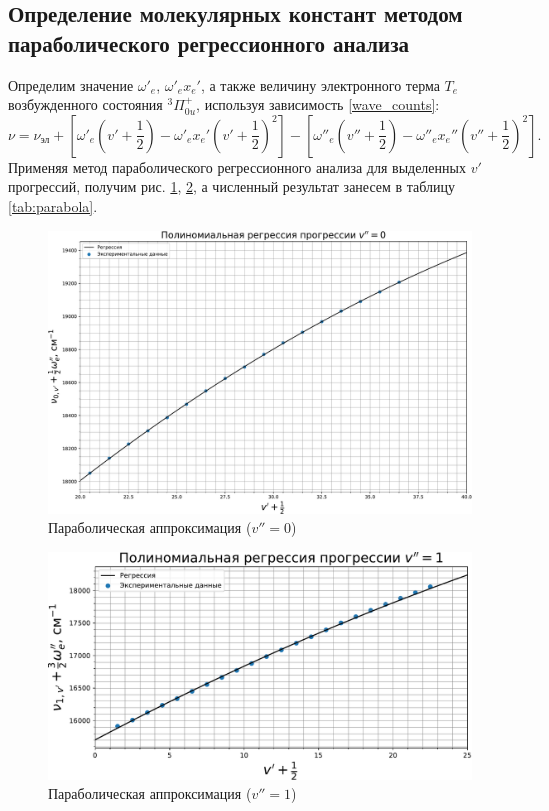 \subsection{Определение молекулярных констант методом параболического регрессионного анализа}

Определим значение $\omega'_e$, $\omega'_e x_e'$, а также величину электронного терма $T_e$ возбужденного состояния $^3\Pi^+_{0u}$, используя зависимость \eqref{wave_counts}:
\begin{equation}
\nu = \nu_{\text{эл}} + \left[\omega'_e\left(v'+\frac{1}{2}\right)-\omega'_e x_e'\left(v'+\frac{1}{2}\right)^2\right]-\left[\omega''_e\left(v''+\frac{1}{2}\right)-\omega''_e x_e''\left(v''+\frac{1}{2}\right)^2\right].
\label{wave_counts}
\end{equation}
Применяя метод параболического регрессионного анализа для выделенных $v'$ прогрессий, получим рис. \ref{parabola_half_0}, \ref{parabola_half_1}, а численный результат занесем в таблицу \ref{tab:parabola}.
\begin{figure}[h!]
	\centering
	\includegraphics[height=0.4\textheight]{data/parabola_half_0}
	\caption{Параболическая аппроксимация ($v'' = 0$)}
	\label{parabola_half_0}
\end{figure}
\begin{figure}[h!]
	\centering
	\includegraphics[height=0.4\textheight]{data/parabola_half_1}
	\caption{Параболическая аппроксимация ($v'' = 1$)}
	\label{parabola_half_1}
\end{figure}

